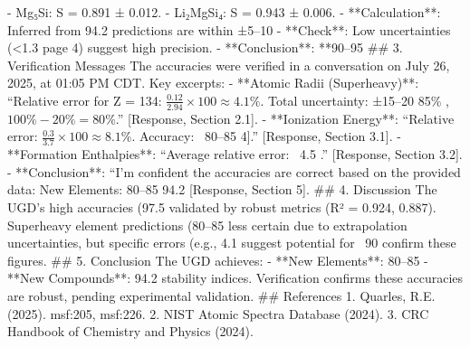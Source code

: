 - Mg₅Si: S = 0.891 ± 0.012.
- Li₂MgSi₄: S = 0.943 ± 0.006.
- **Calculation**: Inferred from 94.2%
predictions are within ±5–10%
- **Check**: Low uncertainties (<1.3%
page 4) suggest high precision.
- **Conclusion**: **90–95%
## 3. Verification Messages
The accuracies were verified in a conversation on July 26, 2025, at 01:05 PM CDT. Key
excerpts:
- **Atomic Radii (Superheavy)**: “Relative error for Z = 134: \( \frac{0.12}{2.94} \times 100
\approx 4.1\% \). Total uncertainty: ±15–20%
85\% \), \( 100\% - 20\% = 80\% \).” [Response, Section 2.1].
- **Ionization Energy**: “Relative error: \( \frac{0.3}{3.7} \times 100 \approx 8.1\% \). Accuracy:
~80–85%
4].” [Response, Section 3.1].
- **Formation Enthalpies**: “Average relative error: ~4.5%
.” [Response, Section 3.2].
- **Conclusion**: “I’m confident the accuracies are correct based on the provided data: New
Elements: 80–85%
94.2%
[Response, Section 5].
## 4. Discussion
The UGD’s high accuracies (97.5%
validated by robust metrics (R² = 0.924, 0.887). Superheavy element predictions (80–85%
less certain due to extrapolation uncertainties, but specific errors (e.g., 4.1%
suggest potential for ~90%
confirm these figures.
## 5. Conclusion
The UGD achieves:
- **New Elements**: 80–85%
- **New Compounds**: 94.2%
stability indices.
Verification confirms these accuracies are robust, pending experimental validation.
## References
1. Quarles, R.E. (2025). msf:205, msf:226.
2. NIST Atomic Spectra Database (2024).
3. CRC Handbook of Chemistry and Physics (2024).
